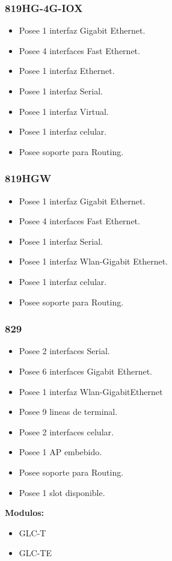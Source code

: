 \documentclass{article}
\begin{document}
\subsubsection{819HG-4G-IOX}
\begin{itemize}
    \item Posee 1 interfaz Gigabit Ethernet.
    \item Posee 4 interfaces Fast Ethernet.
    \item Posee 1 interfaz Ethernet.
    \item Posee 1 interfaz Serial.
    \item Posee 1 interfaz Virtual.
    \item Posee 1 interfaz celular.
    \item Posee soporte para Routing.
\end{itemize}

\subsubsection{819HGW}
\begin{itemize}
    \item Posee 1 interfaz Gigabit Ethernet.
    \item Posee 4 interfaces Fast Ethernet.
    \item Posee 1 interfaz Serial.
    \item Posee 1 interfaz Wlan-Gigabit Ethernet.
    \item Posee 1 interfaz celular.
    \item Posee soporte para Routing.
\end{itemize}

\subsubsection{829}
\begin{itemize}
    \item Posee 2 interfaces Serial.
    \item Posee 6 interfaces Gigabit Ethernet.
    \item Posee 1 interfaz Wlan-GigabitEthernet
    \item Posee 9 lineas de terminal.
    \item Posee 2 interfaces celular.
    \item Posee 1 AP embebido.
    \item Posee soporte para Routing.
    \item Posee 1 slot disponible.
\end{itemize}
\textbf{Modulos:}
\begin{itemize}
    \item GLC-T
    \item GLC-TE
\end{itemize}
\end{document}
